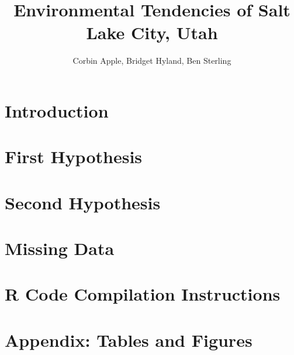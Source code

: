 \documentclass[final]{siamart1116}
\title{Environmental Tendencies of Salt Lake City, Utah}
\author{Corbin Apple, Bridget Hyland, Ben Sterling}
\begin{document}
\maketitle

\section{Introduction}


\section{First Hypothesis}


\section{Second Hypothesis}


\section{Missing Data}


\section{R Code Compilation Instructions}

\newpage




\section{Appendix: Tables and Figures}
\newpage


\end{document}
